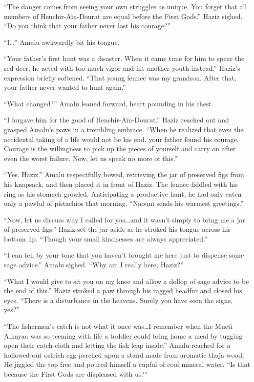 ``The danger comes from seeing your own struggles as unique. You forget that all members of Henchir-Aïn-Dourat are equal before the First Gods.'' Haziz sighed. ``Do you think that your father never lost his courage?''

``I\ldots'' Amalu awkwardly bit his tongue.

``Your father's first hunt was a disaster. When it came time for him to spear the red deer, he acted with too much vigor and hit another youth instead.'' Haziz's expression briefly softened. ``That young fennec was my grandson. After that, your father never wanted to hunt again.''

``What changed?'' Amalu leaned forward, heart pounding in his chest.

``I forgave him for the good of Henchir-Aïn-Dourat.'' Haziz reached out and grasped Amalu's paws in a trembling embrace. ``When he realized that even the accidental taking of a life would not be his end, your father found his courage. Courage is the willingness to pick up the pieces of yourself and carry on after even the worst failure. Now, let us speak no more of this.''

``Yes, Haziz.'' Amalu respectfully bowed, retrieving the jar of preserved figs from his knapsack, and then placed it in front of Haziz. The fennec fiddled with his ring as his stomach growled. Anticipating a productive hunt, he had only eaten only a pawful of pistachios that morning. ``Naoum sends his warmest greetings.''

``Now, let us discuss why I called for you\ldots{}and it wasn't simply to bring me a jar of preserved figs.'' Haziz set the jar aside as he stroked his tongue across his bottom lip. ``Though your small kindnesses are always appreciated.''

``I can tell by your tone that you haven't brought me here just to dispense some sage advice.'' Amalu sighed. ``Why am I really here, Haziz?''

``What I would give to sit you on my knee and allow a dollop of sage advice to be the end of this.'' Haziz stroked a paw through his ragged headfur and closed his eyes. ``There is a disturbance in the heavens. Surely you have seen the signs, yes?''

``The fishermen's catch is not what it once was\ldots{}I remember when the Mueti Alhayaa was so teeming with life a toddler could bring home a meal by tugging open their catch-cloth and letting the fish leap inside.'' Amalu reached for a hollowed-out ostrich egg perched upon a stand made from aromatic thuja wood. He jiggled the top free and poured himself a cupful of cool mineral water. ``Is that because the First Gods are displeased with us?''

